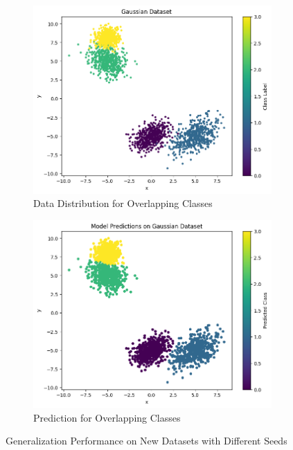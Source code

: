 \documentclass{article}
\begin{document}
\begin{figure}[ht]
  \begin{subfigure}{0.4\textwidth}
    \includegraphics[width=\textwidth]{images/q1_data_dist_ovlp_45.png}
    \caption{Data Distribution for Overlapping Classes}
  \end{subfigure}
  \hspace{0.5cm}
  \begin{subfigure}{0.4\textwidth}
    \includegraphics[width=\textwidth]{images/q1_pred_dist_ovlp_45.png}
    \caption{Prediction for Overlapping Classes}
  \end{subfigure}
  
  \caption{Generalization Performance on New Datasets with Different Seeds}
  \label{fig:gen_data_dist}
\end{figure}
\end{document}
